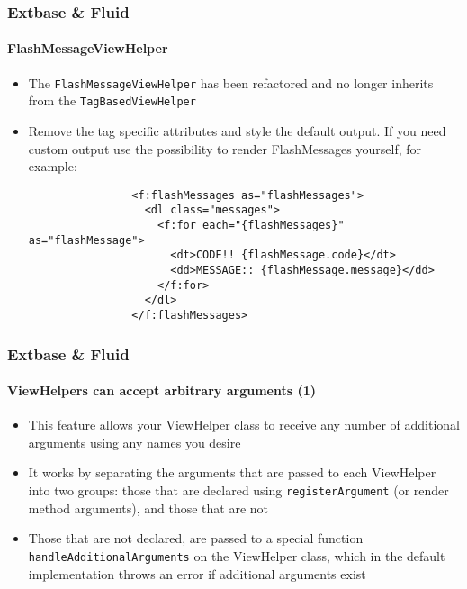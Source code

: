\begin{frame}[fragile]
	\frametitle{Extbase \& Fluid}
	\framesubtitle{FlashMessageViewHelper}

	\lstset{basicstyle=\tiny\ttfamily}

	\begin{itemize}
		\item The \texttt{FlashMessageViewHelper} has been refactored and no longer inherits
			from the \texttt{TagBasedViewHelper}

		\item Remove the tag specific attributes and style the default output.
			If you need custom output use the possibility to render FlashMessages yourself, for example:

			\begin{lstlisting}
				<f:flashMessages as="flashMessages">
				  <dl class="messages">
				    <f:for each="{flashMessages}" as="flashMessage">
				      <dt>CODE!! {flashMessage.code}</dt>
				      <dd>MESSAGE:: {flashMessage.message}</dd>
				    </f:for>
				  </dl>
				</f:flashMessages>
			\end{lstlisting}

	\end{itemize}

\end{frame}


\begin{frame}[fragile]
	\frametitle{Extbase \& Fluid}
	\framesubtitle{ViewHelpers can accept arbitrary arguments (1)}

	\begin{itemize}

		\item This feature allows your ViewHelper class to receive any number of
			additional arguments using any names you desire

		\item It works by separating the arguments that are passed to each ViewHelper
			into two groups: those that are declared using \texttt{registerArgument}
			(or render method arguments), and those that are not

		\item Those that are not declared, are passed to a special function
			\texttt{handleAdditionalArguments}
			on the ViewHelper class, which in the default implementation throws an
			error if additional arguments exist

	\end{itemize}

\end{frame}

